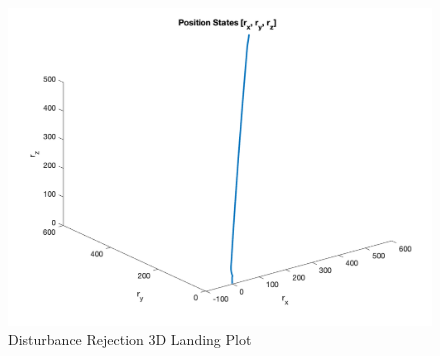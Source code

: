 \documentclass[conference, tikz]{IEEEtran}
\begin{document}
    \begin{figure}[H]{\columnwidth}
        \centering
        \includegraphics[width=\columnwidth]{new_final_figs/DR_Constrained_position_3D_plot.png}
        \caption{Disturbance Rejection 3D Landing Plot}
        \label{DR:3D}
    \end{figure}
\end{document}
